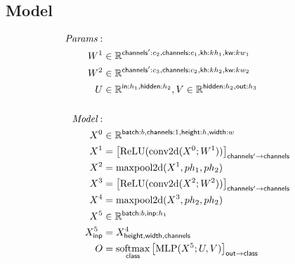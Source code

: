 \documentclass{article}
\newcommand{\reals}[0]{\mathbb{R}}
\begin{document}
\subsection*{Model}

\begin{align*} 
\textit{Params}: \\
W^1 & \in \reals^{\nset{channels'}{c_2}, \nset{channels}{c_1}, \nset{kh}{kh_1}, \nset{kw}{kw_1}} \\ 
W^2 & \in \reals^{\nset{channels'}{c_3}, \nset{channels}{c_2}, \nset{kh}{kh_2}, \nset{kw}{kw_2}} \\ 
U & \in \reals^{\nset{in}{h_1}, \nset{hidden}{h_2}},  V \in \reals^{\nset{hidden}{h_2}, \nset{out}{h_3}} \\ \\
\textit{Model}: \\
X^0 &\in \reals^{\nset{batch}{b}, \nset{channels}{1}, \nset{height}{h}, \nset{width}{w}}\\
X^1 &= \nmov{channels'}{channels}{\text{ReLU}(\text{conv2d}(X^0; W^1))} \\
X^2 &= \text{maxpool2d}(X^1, ph_1, ph_2) \\
X^3 &= \nmov{channels'}{channels}{\text{ReLU}(\text{conv2d}(X^2; W^2))} \\
X^4 &= \text{maxpool2d}(X^3, ph_2, ph_2) \\
X^5 &\in \reals^{\nset{batch}{b}, \nset{inp}{h_1}}\\ 
X^5_{\name{inp}} &= X^4_{\name{height}, \name{width}, \name{channels}}\\ 
O &= \nfun{class}{softmax} \nmov{out}{class}{\text{MLP}(X^5; U, V)}
\end{align*} 


\end{document}
